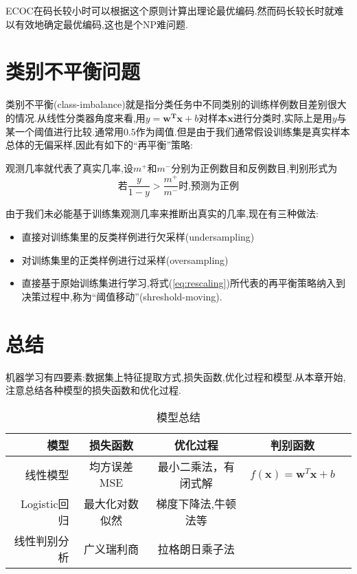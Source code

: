 ECOC在码长较小时可以根据这个原则计算出理论最优编码.然而码长较长时就难以有效地确定最优编码,这也是个NP难问题.

\section{类别不平衡问题}

类别不平衡(class-imbalance)就是指分类任务中不同类别的训练样例数目差别很大的情况.从线性分类器角度来看,用$y=\bm{w^Tx}+b$对样本$\bm x$进行分类时,实际上是用$y$与某一个阈值进行比较.通常用$0.5$作为阈值.但是由于我们通常假设训练集是真实样本总体的无偏采样,因此有如下的``再平衡''策略:

观测几率就代表了真实几率,设$m^+$和$m^-$分别为正例数目和反例数目,判别形式为
\begin{equation}\label{eq:rescaling}
\text{若}\frac{y}{1-y}>\frac{m^+}{m^-}\text{时,预测为正例}
\end{equation}

由于我们未必能基于训练集观测几率来推断出真实的几率,现在有三种做法:
\begin{itemize}
\item 直接对训练集里的反类样例进行欠采样(undersampling)
\item 对训练集里的正类样例进行过采样(oversampling)
\item 直接基于原始训练集进行学习,将式(\ref{eq:rescaling})所代表的再平衡策略纳入到决策过程中,称为``阈值移动''(shreshold-moving).
\end{itemize}

\section*{总结}

机器学习有四要素:数据集上特征提取方式,损失函数,优化过程和模型.从本章开始,注意总结各种模型的损失函数和优化过程.

\begin{table}[!bht]
\caption{模型总结}
\centering
\begin{tabular}{|r|c|c|c|c|}
    \hline
    \textbf{模型} & \textbf{损失函数} & \textbf{优化过程} & \textbf{判别函数} \\ 
    \hline
    线性模型&均方误差MSE&最小二乘法，有闭式解&$f(\bm x)=\bm w^T\bm x+b$\\
    \hline
    Logistic回归&最大化对数似然&梯度下降法,牛顿法等&\\
    \hline
    线性判别分析&广义瑞利商&拉格朗日乘子法&\\
    \hline
\end{tabular}
\end{table}
